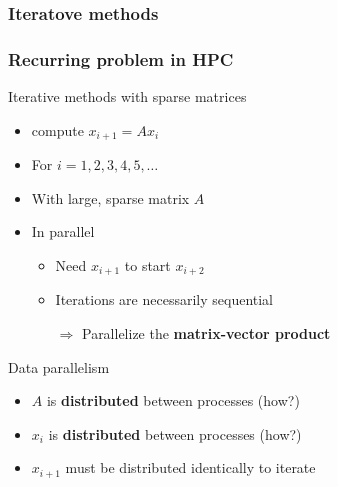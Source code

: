 \documentclass[xcolor={rgb,x11names,svgnames},rgb,x11names,svgnames]{beamer}
\newcommand{\red}{\alert}
\begin{document}
\subsubsection{Iteratove methods}
\begin{frame}
  \frametitle{Recurring problem in HPC}

  \begin{block}{Iterative methods with sparse matrices}
    \begin{itemize}
    \item compute $x_{i+1} = A x_i$
    \item For $i=1, 2, 3,  4, 5, \dots$
    \item With large, sparse matrix $A$
    \item \red{In parallel}
      \begin{itemize}
      \item Need $x_{i+1}$ to start $x_{i+2}$
      \item Iterations are necessarily \red{sequential} 
      \item[$\Rightarrow$] Parallelize the \textbf{matrix-vector product}
      \end{itemize}
    \end{itemize}
  \end{block}  
  
  \begin{exampleblock}{Data parallelism}
    \begin{itemize}
    \item $A$ is \textbf{distributed} between processes (how?)
    \item $x_i$ is \textbf{distributed} between processes (how?)
    \item $x_{i+1}$ must be distributed \red{identically} to iterate
    \end{itemize}
  \end{exampleblock}
  
\end{frame}

\end{document}
